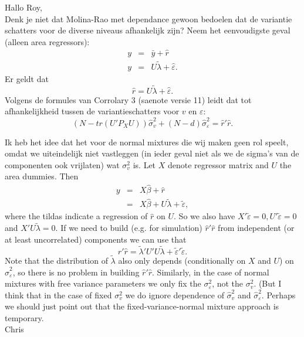 
\noindent{}Hallo Roy,\\[1cm]
Denk je niet dat Molina-Rao met dependance gewoon bedoelen dat de variantie schatters voor de diverse niveaus afhankelijk zijn? Neem het eenvoudigste geval (alleen area regressors):
\begin{eqnarray*}
y &=& \bar{y}+\hat{r}\\
y &=& U\tilde{\lambda}+\hat{\varepsilon}.
\end{eqnarray*}
Er geldt dat 
\[
\hat{r} = U \tilde{\lambda} + \hat{\varepsilon}.
\]
Volgens de formules van Corrolary 3 (saenote versie 11) leidt dat tot afhanke\-lijk\-heid tussen de variantieschatters voor $v$ en $\varepsilon$:
\[
(N-tr(U'P_XU))\hat{\sigma}^2_v+(N-d)\hat{\sigma}^2_{\varepsilon} = \hat{r}'\hat{r}.
\]

Ik heb het idee dat het voor de normal mixtures die wij maken geen rol speelt, omdat we uiteindelijk niet vastleggen (in ieder geval niet als we de sigma's van de componenten ook vrijlaten) wat $\sigma^2_v$ is. Let $X$ denote regressor matrix and $U$ the area dummies. Then 
\begin{eqnarray*}
y &=& X \hat{\beta} + \hat{r}\\
&=& X \hat{\beta} + U \tilde{\lambda} + \tilde{\varepsilon},
\end{eqnarray*}
where the tildas indicate a regression of $\hat{r}$ on $U$. So we also have $X'\tilde{\varepsilon}=0,U'\tilde{\varepsilon}=0$ and $X'U\tilde{\lambda}=0$. If we need to build (e.g. for simulation) $\hat{r}'\hat{r}$ from independent (or at least uncorrelated) components we can use that
\[
\hat{r}'\hat{r} = \tilde{\lambda}'U'U\tilde{\lambda} + \tilde{\varepsilon}'\tilde{\varepsilon}.
\]
Note that the distribution of $\tilde{\lambda}$ also only depends (conditionally on $X$ and $U$) on $\hat{\sigma}^2_{\varepsilon}$, so there is no problem in building $\hat{r}'\hat{r}$. Similarly, in the case of normal mixtures with free variance parameters we only fix the $\sigma^2_{\varepsilon}$, not the $\sigma^2_v$. (But I think that in the case of fixed $\sigma^2_v$ we do ignore dependence of $\hat{\sigma}^2_v$ and 
$\hat{\sigma}^2_{\varepsilon}$. Perhaps we should just point out that the fixed-variance-normal mixture approach is temporary.\\[1cm]
Chris
 